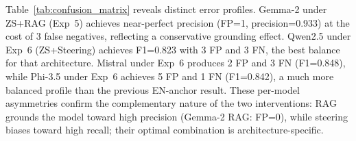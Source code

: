 \documentclass{ieeeaccess}
\begin{document}
Table~\ref{tab:confusion_matrix} reveals distinct error profiles. Gemma-2 under ZS+RAG (Exp~5) achieves near-perfect precision (FP=1, precision=0.933) at the cost of 3 false negatives, reflecting a conservative grounding effect. Qwen2.5 under Exp~6 (ZS+Steering) achieves F1=0.823 with 3 FP and 3 FN, the best balance for that architecture. Mistral under Exp~6 produces 2 FP and 3 FN (F1=0.848), while Phi-3.5 under Exp~6 achieves 5 FP and 1 FN (F1=0.842), a much more balanced profile than the previous EN-anchor result. These per-model asymmetries confirm the complementary nature of the two interventions: RAG grounds the model toward high precision (Gemma-2 RAG: FP=0), while steering biases toward high recall; their optimal combination is architecture-specific.

\end{document}
